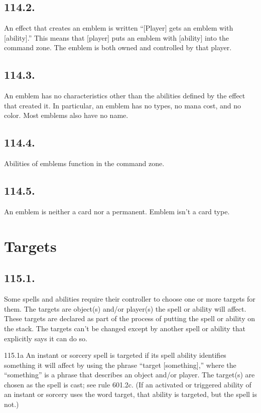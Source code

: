 \subsection*{114.2.}
An effect that creates an emblem is written “[Player] gets an emblem with [ability].” This means that [player] puts an emblem with [ability] into the command zone. The emblem is both owned and controlled by that player.

\subsection*{114.3.}
An emblem has no characteristics other than the abilities defined by the effect that created it. In particular, an emblem has no types, no mana cost, and no color. Most emblems also have no name.

\subsection*{114.4.}
Abilities of emblems function in the command zone.

\subsection*{114.5.}
An emblem is neither a card nor a permanent. Emblem isn’t a card type.

\section{Targets}
\subsection*{115.1.}
Some spells and abilities require their controller to choose one or more targets for them. The targets are object(s) and/or player(s) the spell or ability will affect. These targets are declared as part of the process of putting the spell or ability on the stack. The targets can’t be changed except by another spell or ability that explicitly says it can do so.

115.1a An instant or sorcery spell is targeted if its spell ability identifies something it will affect by using the phrase “target [something],” where the “something” is a phrase that describes an object and/or player. The target(s) are chosen as the spell is cast; see rule 601.2c. (If an activated or triggered ability of an instant or sorcery uses the word target, that ability is targeted, but the spell is not.)

